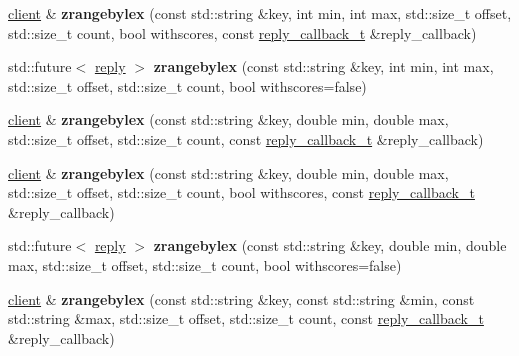 \begin{DoxyCompactItemize}
\mbox{\label{classcpp__redis_1_1client_a4cc2ba0abcf9bd6440dd7e135a3bbaa8}} 
\mbox{\hyperlink{classcpp__redis_1_1client}{client}} \& {\bfseries zrangebylex} (const std\+::string \&key, int min, int max, std\+::size\+\_\+t offset, std\+::size\+\_\+t count, bool withscores, const \mbox{\hyperlink{classcpp__redis_1_1client_af7a65eb21aa25230bfbb0b0203c4fc04}{reply\+\_\+callback\+\_\+t}} \&reply\+\_\+callback)
\item 
\mbox{\label{classcpp__redis_1_1client_a6a80eb65fe3699f645de8aef6ee51f31}} 
std\+::future$<$ \mbox{\hyperlink{classcpp__redis_1_1reply}{reply}} $>$ {\bfseries zrangebylex} (const std\+::string \&key, int min, int max, std\+::size\+\_\+t offset, std\+::size\+\_\+t count, bool withscores=false)
\item 
\mbox{\label{classcpp__redis_1_1client_a29e99528c5fec2fb91162e9d2e8a8faf}} 
\mbox{\hyperlink{classcpp__redis_1_1client}{client}} \& {\bfseries zrangebylex} (const std\+::string \&key, double min, double max, std\+::size\+\_\+t offset, std\+::size\+\_\+t count, const \mbox{\hyperlink{classcpp__redis_1_1client_af7a65eb21aa25230bfbb0b0203c4fc04}{reply\+\_\+callback\+\_\+t}} \&reply\+\_\+callback)
\item 
\mbox{\label{classcpp__redis_1_1client_a52d7c1d498be9ba5182d1ea099e3e5ed}} 
\mbox{\hyperlink{classcpp__redis_1_1client}{client}} \& {\bfseries zrangebylex} (const std\+::string \&key, double min, double max, std\+::size\+\_\+t offset, std\+::size\+\_\+t count, bool withscores, const \mbox{\hyperlink{classcpp__redis_1_1client_af7a65eb21aa25230bfbb0b0203c4fc04}{reply\+\_\+callback\+\_\+t}} \&reply\+\_\+callback)
\item 
\mbox{\label{classcpp__redis_1_1client_a2de8817334902054e27899968c328d9f}} 
std\+::future$<$ \mbox{\hyperlink{classcpp__redis_1_1reply}{reply}} $>$ {\bfseries zrangebylex} (const std\+::string \&key, double min, double max, std\+::size\+\_\+t offset, std\+::size\+\_\+t count, bool withscores=false)
\item 
\mbox{\label{classcpp__redis_1_1client_af982ec533dbf849b88265ccfdcb88210}} 
\mbox{\hyperlink{classcpp__redis_1_1client}{client}} \& {\bfseries zrangebylex} (const std\+::string \&key, const std\+::string \&min, const std\+::string \&max, std\+::size\+\_\+t offset, std\+::size\+\_\+t count, const \mbox{\hyperlink{classcpp__redis_1_1client_af7a65eb21aa25230bfbb0b0203c4fc04}{reply\+\_\+callback\+\_\+t}} \&reply\+\_\+callback)

\end{DoxyCompactItemize}
